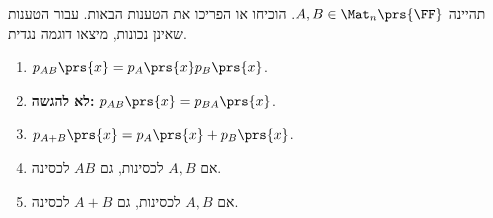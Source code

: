 \documentclass[a4paper,10pt,twoside,openany]{article}
\begin{document}
\begin{exercise}
תהיינה
$A,B \in \Mat_n\prs{\FF}$.
הוכיחו או הפריכו את הטענות הבאות. עבור הטענות שאינן נכונות, מיצאו דוגמה נגדית.

\begin{enumerate}
\item $p_{AB}\prs{x} = p_{A}\prs{x} p_{B}\prs{x}$.
\item \textbf{לא להגשה:}
$p_{AB}\prs{x} = p_{BA}\prs{x}$.
\item $p_{A+B}\prs{x} = p_A\prs{x} + p_B\prs{x}$.
\item אם
$A,B$
לכסינות, גם
$AB$
לכסינה.
\item אם
$A,B$
לכסינות, גם
$A+B$
לכסינה.
\end{enumerate}
\end{exercise}
\end{document}

